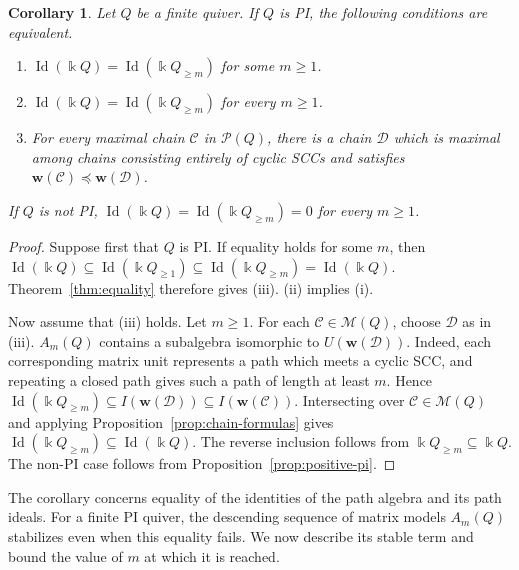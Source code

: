 \documentclass[11pt,reqno]{amsart}
\newcommand{\kk}{\Bbbk}
\newcommand{\Id}{\operatorname{Id}}
\newtheorem{corollary}[theorem]{Corollary}
\theoremstyle{definition}
\theoremstyle{remark}
\numberwithin{equation}{section}
\begin{document}
\begin{corollary}\label{cor:all-tail-equality}
Let $Q$ be a finite quiver. If $Q$ is PI, the following
conditions are equivalent. 
\begin{enumerate}
\item $\Id(\kk Q)=\Id(\kk Q_{\ge m})$ for some $m\ge1$.
\item $\Id(\kk Q)=\Id(\kk Q_{\ge m})$ for every $m\ge1$.
\item For every maximal chain $\mathcal C$ in $\mathcal P(Q)$,
there is a chain $\mathcal D$ which is maximal among chains
consisting entirely of cyclic SCCs and satisfies
$\mathbf w(\mathcal C)\preceq\mathbf w(\mathcal D)$.
\end{enumerate}
If $Q$ is not PI, $\Id(\kk Q)=\Id(\kk Q_{\ge m})=0$ for every $m\ge1$.

\end{corollary}

\begin{proof}
Suppose first that $Q$ is PI.
If equality holds for some $m$, then
$
 \Id(\kk Q)\subseteq\Id(\kk Q_{\ge1})
 \subseteq\Id(\kk Q_{\ge m})=\Id(\kk Q)$.
Theorem~\ref{thm:equality} therefore gives \textup{(iii)}. \textup{(ii)} implies \textup{(i)}.



Now assume that \textup{(iii)} holds. Let $m\ge1$.
For each $\mathcal C\in\mathscr M(Q)$, choose $\mathcal D$
as in \textup{(iii)}.
 $A_m(Q)$ contains a subalgebra isomorphic to
$U(\mathbf w(\mathcal D))$.
Indeed, each corresponding matrix unit represents a path
which meets a cyclic SCC, and repeating a closed path gives
such a path of length at least $m$.  Hence
$
 \Id(\kk Q_{\ge m})
 \subseteq I(\mathbf w(\mathcal D))
 \subseteq I(\mathbf w(\mathcal C))$.
Intersecting over $\mathcal C\in\mathscr M(Q)$ and applying
Proposition~\ref{prop:chain-formulas} gives
$\Id(\kk Q_{\ge m})\subseteq\Id(\kk Q)$.
The reverse inclusion follows from
$\kk Q_{\ge m}\subseteq\kk Q$.
The non-PI case follows from Proposition~\ref{prop:positive-pi}.
\end{proof}


The corollary concerns equality of the identities of the path
algebra and its path ideals. For a finite PI quiver, the descending
sequence of matrix models $A_m(Q)$ stabilizes even when this
equality fails. We now describe its stable term and bound
the value of $m$ at which it is reached.
\end{document}

